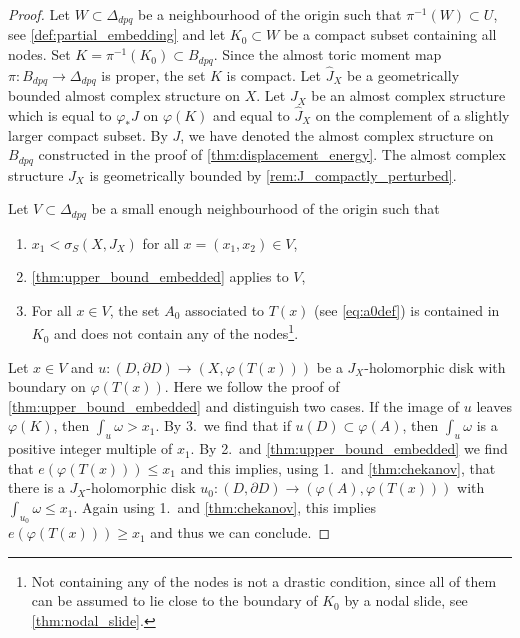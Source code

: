 \documentclass[12pt,a4paper,draft]{scrartcl}
\begin{document}
\begin{proof}
Let $W \subset \Delta_{dpq}$ be a neighbourhood of the origin such that $\pi^{-1}(W) \subset U$, see \cref{def:partial_embedding} and let $K_0 \subset W$ be a compact subset containing all nodes.
Set $K = \pi^{-1}(K_0) \subset B_{dpq}$.
Since the almost toric moment map $\pi \colon B_{dpq} \rightarrow \Delta_{dpq}$ is proper, the set $K$ is compact.
Let $\widehat{J}_X$ be a geometrically bounded almost complex structure on $X$.
Let $J_X$ be an almost complex structure which is equal to $\varphi_* J$ on $\varphi(K)$ and equal to $\widehat{J}_X$ on the complement of a slightly larger compact subset.
By $J$, we have denoted the almost complex structure on $B_{dpq}$ constructed in the proof of \cref{thm:displacement_energy}.
The almost complex structure $J_X$ is geometrically bounded by \cref{rem:J_compactly_perturbed}.

Let $V \subset \Delta_{dpq}$ be a small enough neighbourhood of the origin such that 
\begin{enumerate}
    \item $x_1 < \sigma_S(X,J_X)$ for all $x = (x_1,x_2) \in V$,
    \item \cref{thm:upper_bound_embedded} applies to $V$,
    \item For all $x \in V$, the set $A_0$ associated to $T(x)$ (see \eqref{eq:a0def}) is contained in $K_0$ and does not contain any of the nodes\footnote{Not containing any of the nodes is not a drastic condition, since all of them can be assumed to lie close to the boundary of $K_0$ by a nodal slide, see \cref{thm:nodal_slide}.}. 
\end{enumerate}
Let $x \in V$ and $u \colon (D,\partial D) \rightarrow (X,\varphi(T(x)))$ be a $J_X$-holomorphic disk with boundary on $\varphi(T(x))$.
Here we follow the proof of \cref{thm:upper_bound_embedded} and distinguish two cases.
If the image of $u$ leaves $\varphi(K)$, then $\int_{u} \omega > x_1$.
By 3.\ we find that if $u(D) \subset \varphi(A)$, then $\int_{u} \omega$ is a positive integer multiple of $x_1$.
By 2.\ and \cref{thm:upper_bound_embedded} we find that $e(\varphi(T(x))) ≤ x_1$ and this implies, using 1.\ and \cref{thm:chekanov}, that there is a $J_X$-holomorphic disk $u_0 \colon (D,\partial D) \rightarrow (\varphi(A),\varphi(T(x)))$ with $\int_{u_0} \omega ≤ x_1$.
Again using 1.\ and \cref{thm:chekanov}, this implies $e(\varphi(T(x))) ≥ x_1$ and thus we can conclude.
\end{proof}
\end{document}
